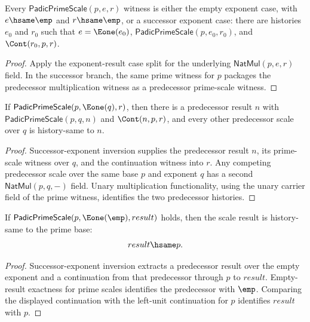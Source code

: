 \begin{lemma}
\label{lem:padic-prime-scale-exponent-result-cases}
Every \(\mathsf{PadicPrimeScale}(p,e,r)\) witness is either the empty exponent
case, with \(e\hsame\emp\) and \(r\hsame\emp\), or a successor exponent case:
there are histories \(e_0\) and \(r_0\) such that
\(e=\Eone(e_0)\), \(\mathsf{PadicPrimeScale}(p,e_0,r_0)\), and
\(\Cont(r_0,p,r)\).
\end{lemma}
\begin{proof}
Apply the exponent-result case split for the underlying
\(\mathsf{NatMul}(p,e,r)\) field. In the successor branch, the same prime
witness for \(p\) packages the predecessor multiplication witness as a
predecessor prime-scale witness.
\end{proof}

\begin{theorem}
\label{thm:padic-prime-scale-succ-exponent-predecessor-unique}
If $\mathsf{PadicPrimeScale}(p,\Eone(q),r)$, then there is a predecessor
result $n$ with $\mathsf{PadicPrimeScale}(p,q,n)$ and $\Cont(n,p,r)$, and
every other predecessor scale over $q$ is history-same to $n$.
\end{theorem}
\begin{proof}
Successor-exponent inversion supplies the predecessor result $n$, its
prime-scale witness over $q$, and the continuation witness into $r$. Any
competing predecessor scale over the same base $p$ and exponent $q$ has a
second $\mathsf{NatMul}(p,q,-)$ field. Unary multiplication functionality,
using the unary carrier field of the prime witness, identifies the two
predecessor histories.
\end{proof}

\begin{theorem}
\label{thm:padic-prime-scale-unit-exponent-result-prime}
If $\mathsf{PadicPrimeScale}(p,\Eone(\emp),result)$ holds, then the scale
result is history-same to the prime base:
$$
result\hsame p.
$$
\end{theorem}
\begin{proof}
Successor-exponent inversion extracts a predecessor result over the empty
exponent and a continuation from that predecessor through $p$ to $result$.
Empty-result exactness for prime scales identifies the predecessor with
$\emp$. Comparing the displayed continuation with the left-unit continuation
for $p$ identifies $result$ with $p$.
\end{proof}

